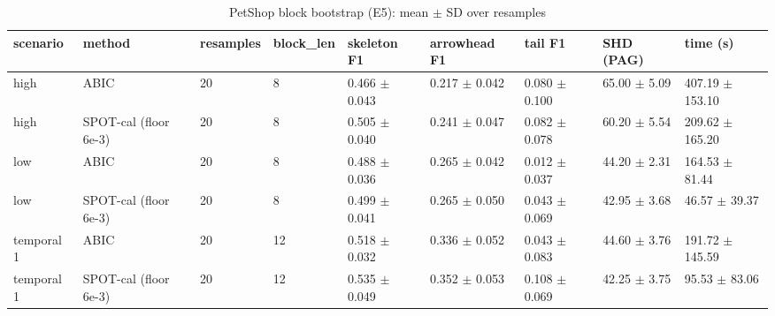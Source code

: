 \begin{table}[t]
\centering\footnotesize
\caption{PetShop block bootstrap (E5): mean $\pm$ SD over resamples}\label{tab:T2c_petshop_bootstrap}
\begin{tabular}{@{}lllllllll@{}}
\toprule
scenario & method & resamples & block\_len & skeleton F1 & arrowhead F1 & tail F1 & SHD (PAG) & time (s)\\
\midrule
high & ABIC & 20 & 8 & 0.466 $\pm$ 0.043 & 0.217 $\pm$ 0.042 & 0.080 $\pm$ 0.100 & 65.00 $\pm$ 5.09 & 407.19 $\pm$ 153.10\\
high & SPOT-cal (floor 6e-3) & 20 & 8 & 0.505 $\pm$ 0.040 & 0.241 $\pm$ 0.047 & 0.082 $\pm$ 0.078 & 60.20 $\pm$ 5.54 & 209.62 $\pm$ 165.20\\
low & ABIC & 20 & 8 & 0.488 $\pm$ 0.036 & 0.265 $\pm$ 0.042 & 0.012 $\pm$ 0.037 & 44.20 $\pm$ 2.31 & 164.53 $\pm$ 81.44\\
low & SPOT-cal (floor 6e-3) & 20 & 8 & 0.499 $\pm$ 0.041 & 0.265 $\pm$ 0.050 & 0.043 $\pm$ 0.069 & 42.95 $\pm$ 3.68 & 46.57 $\pm$ 39.37\\
temporal 1 & ABIC & 20 & 12 & 0.518 $\pm$ 0.032 & 0.336 $\pm$ 0.052 & 0.043 $\pm$ 0.083 & 44.60 $\pm$ 3.76 & 191.72 $\pm$ 145.59\\
temporal 1 & SPOT-cal (floor 6e-3) & 20 & 12 & 0.535 $\pm$ 0.049 & 0.352 $\pm$ 0.053 & 0.108 $\pm$ 0.069 & 42.25 $\pm$ 3.75 & 95.53 $\pm$ 83.06\\
\bottomrule
\end{tabular}
\end{table}

